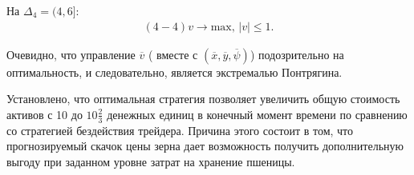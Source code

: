 На $\Delta_4 = (4, 6]$: 
\begin{gather*}
    (4- 4) v \to \mathrm{max}, \,
    |v| \le 1.
\end{gather*}

Очевидно, что управление $\overline{v}$  ( вместе с $(\overline{x}, \overline{y}, \overline{\psi})$) подозрительно на оптимальность, и следовательно, является экстремалью Понтрягина.

Установлено, что оптимальная стратегия позволяет увеличить общую стоимость активов с 10 до $10\frac{2}{3}$ денежных единиц в конечный момент времени по сравнению со стратегией бездействия трейдера. Причина этого состоит в том, что прогнозируемый скачок цены зерна дает возможность получить дополнительную выгоду при заданном уровне затрат на хранение пшеницы.
